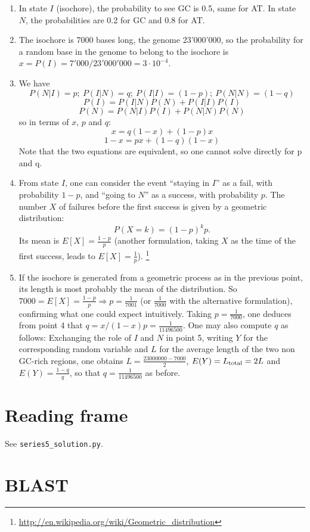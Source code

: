 \documentclass[a4paper,11pt]{article}
\begin{document}
\begin{enumerate}
\item In state $I$ (isochore), the probability to see GC is 0.5, same for AT. In state $N$, the probabilities are 0.2 for GC and 0.8 for AT.
\item The isochore is 7000 bases long, the genome 23'000'000, so the probability for a random base in the genome to belong to the isochore is $x = P(I) = 7'000/23'000'000 = 3\cdot 10^{-4}$.
\item We have
$$ P(N|I)=p; \ P(I|N)=q; \ P(I|I)=(1-p); \ P(N|N)=(1-q)$$
$$ P(I) = P(I|N)P(N) + P(I|I)P(I) $$
$$ P(N) = P(N|I)P(I) + P(N|N)P(N) $$
so in terms of $x$, $p$ and $q$:
$$ x = q(1-x) + (1-p)x $$
$$ 1-x = px + (1-q)(1-x) $$
Note that the two equations are equivalent, so one cannot solve directly for p and q.
\item From state $I$, one can consider the event ``staying in $I$'' as a fail, with probability $1-p$, and ``going to $N$'' as a success, with probability $p$. The number $X$ of failures before the first success is given by a geometric distribution:
$$ P(X=k) = (1-p)^k p .$$
Its mean is $E[X] = \frac{1-p}{p}$ (another formulation, taking $X$ as the time of the first success, leads to $E[X] = \frac{1}{p}$).
\footnote{\url{http://en.wikipedia.org/wiki/Geometric_distribution}}
\item If the isochore is generated from a geometric process as in the previous point, its length is most probably the mean of the distribution. So $7000 = E[X] = \frac{1-p}{p} \Rightarrow p = \frac{1}{7001}$ (or $\frac{1}{7000}$ with the alternative formulation), confirming what one could expect intuitively. Taking $p=\frac{1}{7000}$, one deduces from point 4 that $q = x/(1-x) p = \frac{1}{11496500}$. One may also compute $q$ as follows: Exchanging the role of $I$ and $N$ in point 5, writing $Y$ for the corresponding random variable and $L$ for the average length of the two non GC-rich regions, one obtains $L= \frac{23000000-7000}{2}$, $E(Y)=L_{\rm total}=2L$ and $E(Y) =  \frac{1-q}{q}$, so that $q = \frac{1}{11496500}$ as before.
\end{enumerate}

\section{Reading frame}

See \texttt{series5\_solution.py}.

\section{BLAST}
\end{document}
